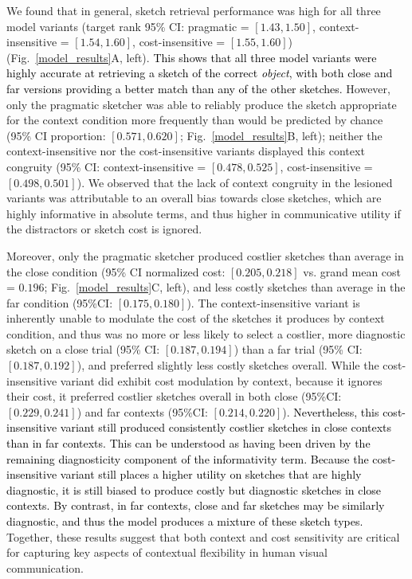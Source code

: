\documentclass{svjour3}
\newcommand{\revised}[1]{\textcolor{Black}{#1}}
\begin{document}
We found that in general, sketch retrieval performance was high for all three model variants (target rank 95\% CI: pragmatic = $[1.43, 1.50]$, context-insensitive = $[1.54, 1.60]$, cost-insensitive = $[1.55, 1.60]$) (Fig.~\ref{model_results}A, left).
\revised{This shows that all three model variants were highly accurate at retrieving a sketch of the correct \textit{object}, with both close and far versions providing a better match than any of the other sketches.}
However, only the pragmatic sketcher was able to reliably produce the sketch appropriate for the context condition more frequently than would be predicted by chance (95\% CI proportion: $[0.571, 0.620]$; Fig.~\ref{model_results}B, left); neither the context-insensitive nor the cost-insensitive variants displayed this context congruity (95\% CI: context-insensitive = $[0.478, 0.525]$, cost-insensitive = $[0.498, 0.501]$). 
We observed that the lack of context congruity in the lesioned variants was attributable to an overall bias towards close sketches, which are highly informative in absolute terms, and thus higher in communicative utility if the distractors or sketch cost is ignored. 

Moreover, only the pragmatic sketcher produced costlier sketches than average in the close condition (95\% CI normalized cost: $[0.205, 0.218]$ vs. grand mean cost = $0.196$; Fig.~\ref{model_results}C, left), and less costly sketches than average in the far condition (95\%CI: $[0.175, 0.180]$). 
The context-insensitive variant is inherently unable to modulate the cost of the sketches it produces by context condition, and thus was no more or less likely to select a costlier, more diagnostic sketch on a close trial (95\% CI: $[0.187, 0.194]$) than a far trial (95\% CI: $[0.187, 0.192]$), and preferred slightly less costly sketches overall. 
While the cost-insensitive variant did exhibit cost modulation by context, because it ignores their cost, it preferred costlier sketches overall in both close (95\%CI: $[0.229, 0.241]$) and far contexts (95\%CI: $[0.214, 0.220]$). 
\revised{Nevertheless, this cost-insensitive variant still produced consistently costlier sketches in close contexts than in far contexts. This can be understood as having been driven by the remaining diagnosticity component of the informativity term. Because the cost-insensitive variant still places a higher utility on sketches that are highly diagnostic, it is still biased to produce costly but diagnostic sketches in close contexts. By contrast, in far contexts, close and far sketches may be similarly diagnostic, and thus the model produces a mixture of these sketch types.}
Together, these results suggest that both context and cost sensitivity are critical for capturing key aspects of contextual flexibility in human visual communication. 
\end{document}
